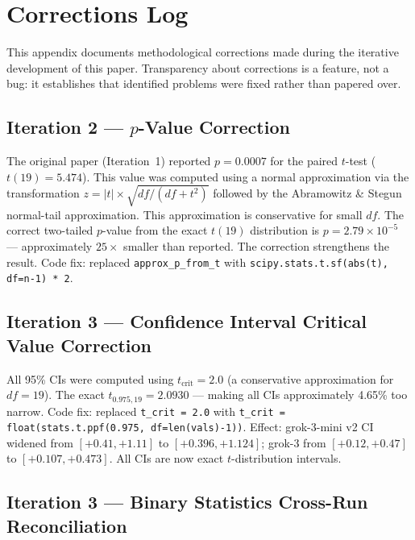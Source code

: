 \documentclass[12pt, letterpaper]{article}
\begin{document}
\appendix

\section{Corrections Log}
\label{app:corrections}

This appendix documents methodological corrections made during the iterative development
of this paper. Transparency about corrections is a feature, not a bug: it establishes
that identified problems were fixed rather than papered over.

\subsection*{Iteration 2 --- $p$-Value Correction}

The original paper (Iteration~1) reported $p = 0.0007$ for the paired $t$-test
($t(19) = 5.474$). This value was computed using a normal approximation via the
transformation $z = |t| \times \sqrt{df/(df + t^2)}$ followed by the Abramowitz
\& Stegun normal-tail approximation. This approximation is conservative for small $df$.
The correct two-tailed $p$-value from the exact $t(19)$ distribution is
$p = 2.79 \times 10^{-5}$ --- approximately $25\times$ smaller than reported.
The correction strengthens the result. Code fix: replaced \texttt{approx\_p\_from\_t}
with \texttt{scipy.stats.t.sf(abs(t), df=n-1) * 2}.

\subsection*{Iteration 3 --- Confidence Interval Critical Value Correction}

All 95\% CIs were computed using $t_\text{crit} = 2.0$ (a conservative approximation
for $df = 19$). The exact $t_{0.975, 19} = 2.0930$ --- making all CIs approximately
4.65\% too narrow. Code fix: replaced \texttt{t\_crit = 2.0} with
\texttt{t\_crit = float(stats.t.ppf(0.975, df=len(vals)-1))}. Effect: grok-3-mini v2
CI widened from $[+0.41, +1.11]$ to $[+0.396, +1.124]$; grok-3 from $[+0.12, +0.47]$
to $[+0.107, +0.473]$. All CIs are now exact $t$-distribution intervals.

\subsection*{Iteration 3 --- Binary Statistics Cross-Run Reconciliation}
\end{document}
